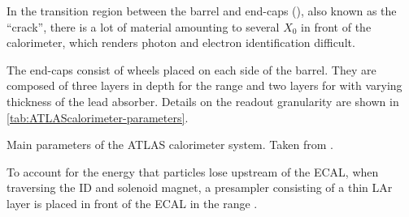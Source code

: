 

In the transition region between the barrel and end-caps (), also known as the ``crack'', there is a lot of material amounting to several $X_0$ in front of the calorimeter, which renders photon and electron identification difficult.

The end-caps consist of wheels placed on each side of the barrel.
They are composed of three layers in depth for the range  and two layers for  with varying thickness of the lead absorber. Details on the readout granularity are shown in \cref{tab:ATLAScalorimeter-parameters}.
\begin{table}[h!]
    \caption[Main parameters of the ATLAS calorimeter system.]{Main parameters of the ATLAS calorimeter system. Taken from .}
    \label{tab:ATLAScalorimeter-parameters}
\end{table}

To account for the energy that particles lose upstream of the ECAL, when traversing the ID and solenoid magnet, a presampler consisting of a thin LAr layer is placed in front of the ECAL in the range .


